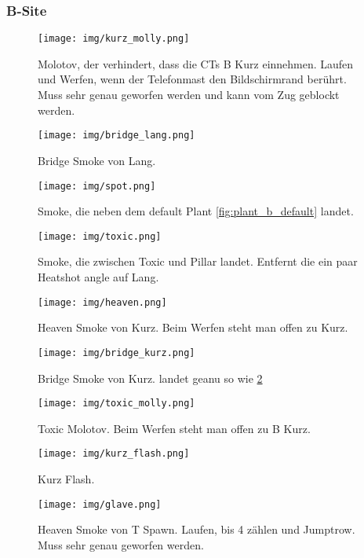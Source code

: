 \subsubsection{B-Site}
\begin{figure}
    \centering
    \texttt{[image: img/kurz\_molly.png]}
    \caption{Molotov, der verhindert, dass die CTs B Kurz einnehmen. Laufen und Werfen, wenn der Telefonmast den Bildschirmrand berührt. Muss sehr genau geworfen werden und kann vom Zug geblockt werden.}
    \label{fig:kurz_molly}
\end{figure}
\begin{figure}
    \centering
    \texttt{[image: img/bridge\_lang.png]}
    \caption{Bridge Smoke von Lang.}
    \label{fig:bridge_lang}
\end{figure}
\begin{figure}
    \centering
    \texttt{[image: img/spot.png]}
    \caption{Smoke, die neben dem default Plant \ref{fig:plant_b_default} landet.}
    \label{fig:spot_smoke}
\end{figure}
\begin{figure}
    \centering
    \texttt{[image: img/toxic.png]}
    \caption{Smoke, die zwischen Toxic und Pillar landet. Entfernt die ein paar Heatshot angle auf Lang.}
    \label{fig:toxic_smoke}
\end{figure}
\begin{figure}
    \centering
    \texttt{[image: img/heaven.png]}
    \caption{Heaven Smoke von Kurz. Beim Werfen steht man offen zu Kurz.}
    \label{fig:heaven_smoke}
\end{figure}
\begin{figure}
    \centering
    \texttt{[image: img/bridge\_kurz.png]}
    \caption{Bridge Smoke von Kurz. landet geanu so wie \ref{fig:bridge_lang}}
    \label{fig:bridge_kurz}
\end{figure}
\begin{figure}
    \centering
    \texttt{[image: img/toxic\_molly.png]}
    \caption{Toxic Molotov. Beim Werfen steht man offen zu B Kurz.}
    \label{fig:toxic_molly}
\end{figure}
\begin{figure}
    \centering
    \texttt{[image: img/kurz\_flash.png]}
    \caption{Kurz Flash.}
    \label{fig:kurz_flash}
\end{figure}
\begin{figure}
    \centering
    \texttt{[image: img/glave.png]}
    \caption{Heaven Smoke von T Spawn. Laufen, bis 4 zählen und Jumptrow. Muss sehr genau geworfen werden.}
    \label{fig:glave}
\end{figure}